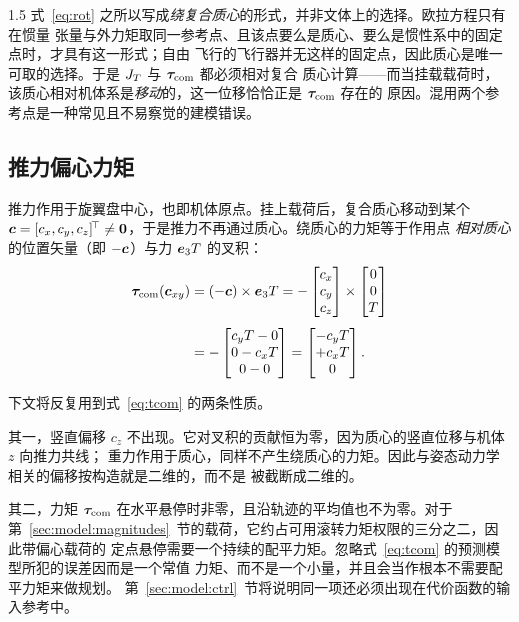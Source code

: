 \begin{spacing}{1.5}
式~\eqref{eq:rot} 之所以写成\emph{绕复合质心}的形式，并非文体上的选择。欧拉方程只有在惯量
张量与外力矩取同一参考点、且该点要么是质心、要么是惯性系中的固定点时，才具有这一形式；自由
飞行的飞行器并无这样的固定点，因此质心是唯一可取的选择。于是 $J_T$ 与 $\bm{\tau}_{\mathrm{com}}$ 都必须相对复合
质心计算——而当挂载载荷时，该质心相对机体系是\emph{移动}的，这一位移恰恰正是 $\bm{\tau}_{\mathrm{com}}$ 存在的
原因。混用两个参考点是一种常见且不易察觉的建模错误。

\subsection{推力偏心力矩}\label{sec:model:tcom}

推力作用于旋翼盘中心，也即机体原点。挂上载荷后，复合质心移动到某个
$\bm{c} = [c_x, c_y, c_z]^{\!\top} \neq \bm{0}$，于是推力不再通过质心。绕质心的力矩等于作用点
\emph{相对质心}的位置矢量（即 $-\bm{c}$）与力 $\bm{e}_3 T$ 的叉积：
\begin{align}
\bm{\tau}_{\mathrm{com}}(\bm{c}_{xy}) &= (-\bm{c}) \times \bm{e}_3 T
= -\begin{bmatrix} c_x \\ c_y \\ c_z \end{bmatrix}
\times \begin{bmatrix} 0 \\ 0 \\ T \end{bmatrix} \nonumber \\[4pt]
&= -\begin{bmatrix} c_y T - 0 \\ 0 - c_x T \\ 0 - 0 \end{bmatrix}
= \begin{bmatrix} -c_y T \\ +c_x T \\ 0 \end{bmatrix}.
\label{eq:tcom}
\end{align}

下文将反复用到式~\eqref{eq:tcom} 的两条性质。

其一，竖直偏移 $c_z$ 不出现。它对叉积的贡献恒为零，因为质心的竖直位移与机体 $z$ 向推力共线；
重力作用于质心，同样不产生绕质心的力矩。因此与姿态动力学相关的偏移按构造就是二维的，而不是
被截断成二维的。

其二，力矩 $\bm{\tau}_{\mathrm{com}}$ 在水平悬停时非零，且沿轨迹的平均值也不为零。对于
第~\ref{sec:model:magnitudes}~节的载荷，它约占可用滚转力矩权限的三分之二，因此带偏心载荷的
定点悬停需要一个持续的配平力矩。忽略式~\eqref{eq:tcom} 的预测模型所犯的误差因而是一个常值
力矩、而不是一个小量，并且会当作根本不需要配平力矩来做规划。
第~\ref{sec:model:ctrl}~节将说明同一项还必须出现在代价函数的输入参考中。


\end{spacing}
